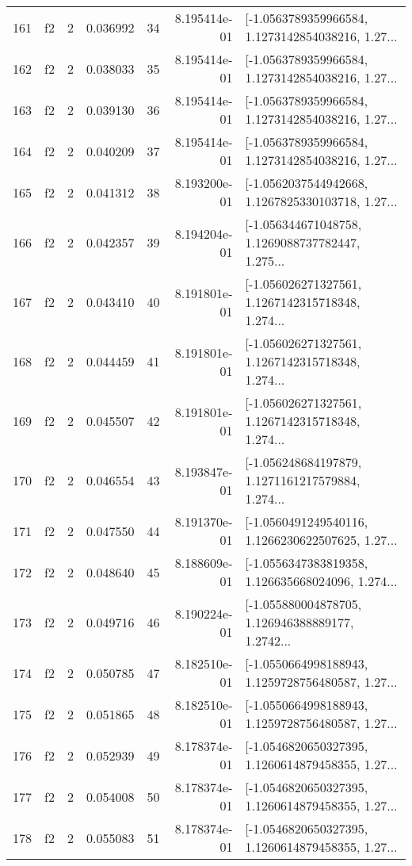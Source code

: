 \begin{tabular}{lllrlrl}
161 &  f2 &   2 &  0.036992 &   34 &  8.195414e-01 &  [-1.0563789359966584, 1.1273142854038216, 1.27... \\
162 &  f2 &   2 &  0.038033 &   35 &  8.195414e-01 &  [-1.0563789359966584, 1.1273142854038216, 1.27... \\
163 &  f2 &   2 &  0.039130 &   36 &  8.195414e-01 &  [-1.0563789359966584, 1.1273142854038216, 1.27... \\
164 &  f2 &   2 &  0.040209 &   37 &  8.195414e-01 &  [-1.0563789359966584, 1.1273142854038216, 1.27... \\
165 &  f2 &   2 &  0.041312 &   38 &  8.193200e-01 &  [-1.0562037544942668, 1.1267825330103718, 1.27... \\
166 &  f2 &   2 &  0.042357 &   39 &  8.194204e-01 &  [-1.056344671048758, 1.1269088737782447, 1.275... \\
167 &  f2 &   2 &  0.043410 &   40 &  8.191801e-01 &  [-1.056026271327561, 1.1267142315718348, 1.274... \\
168 &  f2 &   2 &  0.044459 &   41 &  8.191801e-01 &  [-1.056026271327561, 1.1267142315718348, 1.274... \\
169 &  f2 &   2 &  0.045507 &   42 &  8.191801e-01 &  [-1.056026271327561, 1.1267142315718348, 1.274... \\
170 &  f2 &   2 &  0.046554 &   43 &  8.193847e-01 &  [-1.056248684197879, 1.1271161217579884, 1.274... \\
171 &  f2 &   2 &  0.047550 &   44 &  8.191370e-01 &  [-1.0560491249540116, 1.1266230622507625, 1.27... \\
172 &  f2 &   2 &  0.048640 &   45 &  8.188609e-01 &  [-1.0556347383819358, 1.126635668024096, 1.274... \\
173 &  f2 &   2 &  0.049716 &   46 &  8.190224e-01 &  [-1.055880004878705, 1.126946388889177, 1.2742... \\
174 &  f2 &   2 &  0.050785 &   47 &  8.182510e-01 &  [-1.0550664998188943, 1.1259728756480587, 1.27... \\
175 &  f2 &   2 &  0.051865 &   48 &  8.182510e-01 &  [-1.0550664998188943, 1.1259728756480587, 1.27... \\
176 &  f2 &   2 &  0.052939 &   49 &  8.178374e-01 &  [-1.0546820650327395, 1.1260614879458355, 1.27... \\
177 &  f2 &   2 &  0.054008 &   50 &  8.178374e-01 &  [-1.0546820650327395, 1.1260614879458355, 1.27... \\
178 &  f2 &   2 &  0.055083 &   51 &  8.178374e-01 &  [-1.0546820650327395, 1.1260614879458355, 1.27... \\

\end{tabular}
